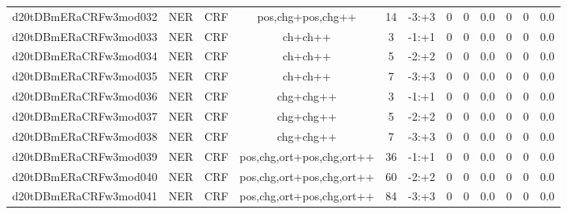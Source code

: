 \documentclass[a4paper]{article}
\begin{document}
\begin{landscape}
\begin{center}
\begin{tabular}{ |c|c|c|c|c|c|c|c|c|c|c|c|}
 
 	
 	\small{ d20tDBmERaCRFw3mod032 } & \small{ NER} & \small{  CRF }  & pos,chg+pos,chg++  &  14 &  \small{  -3:+3 }  &  0 & 0 & 0.0  &  0 & 0 & 0.0 \\
 	

 
 	
 	\small{ d20tDBmERaCRFw3mod033 } & \small{ NER} & \small{  CRF }  & ch+ch++  &  3 &  \small{  -1:+1 }  &  0 & 0 & 0.0  &  0 & 0 & 0.0 \\
 	

 
 	
 	\small{ d20tDBmERaCRFw3mod034 } & \small{ NER} & \small{  CRF }  & ch+ch++  &  5 &  \small{  -2:+2 }  &  0 & 0 & 0.0  &  0 & 0 & 0.0 \\
 	

 
 	
 	\small{ d20tDBmERaCRFw3mod035 } & \small{ NER} & \small{  CRF }  & ch+ch++  &  7 &  \small{  -3:+3 }  &  0 & 0 & 0.0  &  0 & 0 & 0.0 \\
 	

 
 	
 	\small{ d20tDBmERaCRFw3mod036 } & \small{ NER} & \small{  CRF }  & chg+chg++  &  3 &  \small{  -1:+1 }  &  0 & 0 & 0.0  &  0 & 0 & 0.0 \\
 	

 
 	
 	\small{ d20tDBmERaCRFw3mod037 } & \small{ NER} & \small{  CRF }  & chg+chg++  &  5 &  \small{  -2:+2 }  &  0 & 0 & 0.0  &  0 & 0 & 0.0 \\
 	

 
 	
 	\small{ d20tDBmERaCRFw3mod038 } & \small{ NER} & \small{  CRF }  & chg+chg++  &  7 &  \small{  -3:+3 }  &  0 & 0 & 0.0  &  0 & 0 & 0.0 \\
 	

 
 	
 	\small{ d20tDBmERaCRFw3mod039 } & \small{ NER} & \small{  CRF }  & pos,chg,ort+pos,chg,ort++  &  36 &  \small{  -1:+1 }  &  0 & 0 & 0.0  &  0 & 0 & 0.0 \\
 	

 
 	
 	\small{ d20tDBmERaCRFw3mod040 } & \small{ NER} & \small{  CRF }  & pos,chg,ort+pos,chg,ort++  &  60 &  \small{  -2:+2 }  &  0 & 0 & 0.0  &  0 & 0 & 0.0 \\
 	

 
 	
 	\small{ d20tDBmERaCRFw3mod041 } & \small{ NER} & \small{  CRF }  & pos,chg,ort+pos,chg,ort++  &  84 &  \small{  -3:+3 }  &  0 & 0 & 0.0  &  0 & 0 & 0.0 \\
 	


\end{tabular}
\end{center}
\end{landscape}
\end{document}
